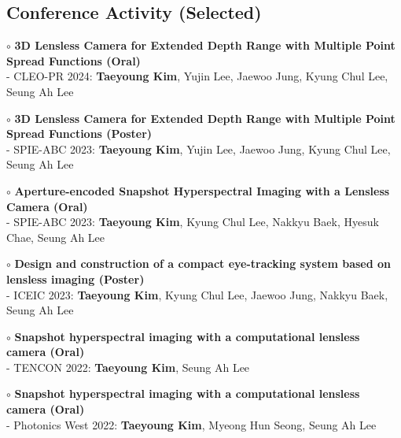 \documentclass[a4paper,9pt]{extarticle}
\begin{document}
\begin{spacing}{1.05}

\section*{Conference Activity (Selected)}




 \noindent $\circ$ \textbf{3D Lensless Camera for Extended Depth Range with Multiple Point Spread Functions (Oral)} \\
- CLEO-PR 2024: \textbf{Taeyoung Kim}, Yujin Lee, Jaewoo Jung, Kyung Chul Lee, Seung Ah Lee 

 \noindent $\circ$ \textbf{3D Lensless Camera for Extended Depth Range with Multiple Point Spread Functions (Poster)} \\
- SPIE-ABC 2023: \textbf{Taeyoung Kim}, Yujin Lee, Jaewoo Jung, Kyung Chul Lee, Seung Ah Lee 

 \noindent $\circ$ \textbf{Aperture-encoded Snapshot Hyperspectral Imaging with a Lensless Camera (Oral)} \\
- SPIE-ABC 2023: \textbf{Taeyoung Kim}, Kyung Chul Lee, Nakkyu Baek, Hyesuk Chae, Seung Ah Lee 

 \noindent $\circ$ \textbf{Design and construction of a compact eye-tracking system based on lensless imaging (Poster)} \\
- ICEIC 2023: \textbf{Taeyoung Kim}, Kyung Chul Lee, Jaewoo Jung, Nakkyu Baek, Seung Ah Lee 

 \noindent $\circ$ \textbf{Snapshot hyperspectral imaging with a computational lensless camera (Oral)} \\
- TENCON 2022: \textbf{Taeyoung Kim}, Seung Ah Lee 

 \noindent $\circ$ \textbf{Snapshot hyperspectral imaging with a computational lensless camera (Oral)} \\
- Photonics West 2022: \textbf{Taeyoung Kim}, Myeong Hun Seong, Seung Ah Lee 


\end{spacing}
\end{document}
